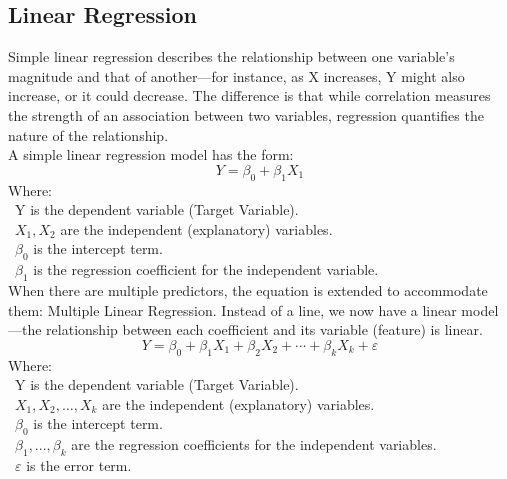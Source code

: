\documentclass{ieeeojies}
\begin{document}
\subsection{Linear Regression}
Simple linear regression describes the relationship between one variable's magnitude and that of another—for instance, as X increases, Y might also increase, or it could decrease. The difference is that while correlation measures the strength of an association between two variables, regression quantifies the nature of the relationship. \cite{b7}\\
A simple linear regression model has the form:
\[Y=\beta_0+\beta_1X_1\]
Where:\\
	\indent\textbullet\ Y is the dependent variable (Target Variable).\\
	\indent\textbullet\ \(X_1, X_2\) are the independent (explanatory) variables.\\
	\indent\textbullet\ \(\beta_0\) is the intercept term.\\
	\indent\textbullet\ \(\beta_1\) is the regression coefficient for the independent variable.\\
When there are multiple predictors, the equation is extended to accommodate them: Multiple Linear Regression. Instead of a line, we now have a linear model—the relationship between each coefficient and its variable (feature) is linear.
\[Y=\beta_0+\beta_1 X_1+\beta_2 X_2+\cdots+\beta_k X_k+\varepsilon\]
Where:\\
	\indent\textbullet\ Y is the dependent variable (Target Variable).\\
	\indent\textbullet\ \(X_1, X_2, \ldots, X_k\) are the independent (explanatory) variables.\\
	\indent\textbullet\ \(\beta_0\) is the intercept term.\\
	\indent\textbullet\ \(\beta_1,..., \beta_k\) are the regression coefficients for the independent variables.\\
	\indent\textbullet\ \(\varepsilon\) is the error term.
 
\end{document}
